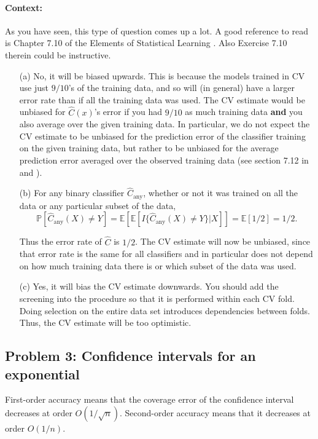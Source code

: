 \paragraph{Context:} As you have seen, this type of question comes up a lot. A good reference to read is Chapter 7.10 of the Elements of Statistical Learning \citep*{hastie2009elements}. Also Exercise 7.10 therein could be instructive.

\begin{itemize}
\item[(a)] No, it will be biased upwards. This is because the models trained in CV use just $9/10$'s of the training data, and so will (in general) have a larger error rate than if all the training data was used. The CV estimate would be unbiased for $\hat{C}(x)$'s error if you had $9/10$ as much training data \textbf{and} you also average over the given training data. In particular, we do not expect the CV estimate to be unbiased for the prediction error of the classifier training on the given training data, but rather to be unbiased for the average prediction error averaged over the observed training data (see section 7.12 in \citep*{hastie2009elements} and \citep*{Bates2022CrossVal}).  

\item[(b)] For any binary classifier $\hat{C}_{\text{any}}$, whether or not it was trained on all the data or any particular subset of the data, $$\mathbb P[\hat C_{\text{any}}(X) \neq Y] = \mathbb E[ \mathbb E  [I \{ \hat C_{\text{any}}(X) \neq Y \} |X]] = \mathbb E[1/2] = 1/2.$$

Thus the error rate of $\hat{C}$ is $1/2$. The CV estimate will now be unbiased, since that error rate is the same for all classifiers and in particular does not depend on how much training data there is or which subset of the data was used.

\item[(c)] Yes, it will bias the CV estimate downwards. You should add the screening into the procedure so that it is performed within each CV fold. Doing selection on the entire data set introduces dependencies between folds. Thus, the CV estimate will be too optimistic.
\end{itemize}


\subsection*{Problem 3:  Confidence intervals for an exponential}
First-order accuracy means that the coverage error of the confidence interval decreases at order $O(1/\sqrt{n})$. Second-order accuracy means that it decreases at order $O(1/n)$.

